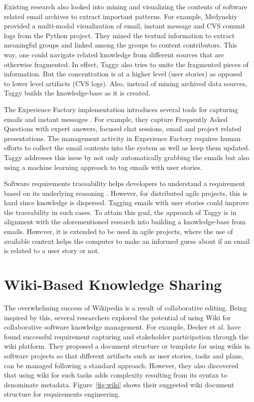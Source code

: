 Existing research also looked into mining and visualizing the contents of software related email archives to extract important patterns. For example, Medynskiy provided a multi-modal visualization of email, instant message and CVS commit logs from the Python project\cite{using_hybrid}. They mined the textual information to extract meaningful groups and linked among the groups to content contributors. This way, one could navigate related knowledge from different sources that are otherwise fragmented. In effect, Taggy also tries to unite the fragmented pieces of information. But the concentration is at a higher level (user stories) as opposed to lower level artifacts (CVS logs). Also, instead of mining archived data sources, Taggy builds the knowledge-base as it is created.

The Experience Factory implementation introduces several tools for capturing emails and instant messages \cite{implementing_an_experience}. For example, they capture Frequently Asked Questions with expert answers, focused chat sessions, email and project related presentations. The management activity in Experience Factory requires human efforts to collect the email contents into the system as well as keep them updated. Taggy addresses this issue by not only automatically grabbing the emails but also using a machine learning approach to tag emails with user stories.

Software requirements traceability helps developers to understand a requirement based on its underlying reasoning \cite{automating_requirements}. However, for distributed agile projects, this is hard since knowledge is dispersed. Tagging emails with user stories could improve the traceability in such cases. To attain this goal, the approach of Taggy is in alignment with the aforementioned research into building a knowledge-base from emails. However, it is extended to be used in agile projects, where the use of available context helps the computer to make an informed guess about if an email is related to a user story or not.

\section{Wiki-Based Knowledge Sharing}
The overwhelming success of Wikipedia \cite{wikipedia} is a result of collaborative editing. Being inspired by this, several researchers explored the potential of using Wiki for collaborative software knowledge management. For example, Decker et al. have found successful requirement capturing and stakeholder participation through the wiki platform\cite{wiki_based}. They proposed a document structure or template for using wikis in software projects so that different artifacts such as user stories, tasks and plans, can be managed following a standard approach. However, they also discovered that using wiki for such tasks adds complexity resulting from its syntax to denominate metadata. Figure~\ref{fig:wiki} shows their suggested wiki document structure for requirements engineering.

